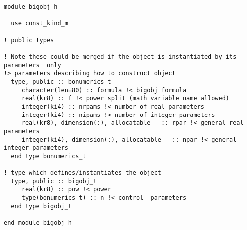 \small
\begin{verbatim}
module bigobj_h

  use const_kind_m

! public types

! Note these could be merged if the object is instantiated by its parameters  only
!> parameters describing how to construct object
  type, public :: bonumerics_t
     character(len=80) :: formula !< bigobj formula
     real(kr8) :: f !< power split (math variable name allowed)
     integer(ki4) :: nrpams !< number of real parameters
     integer(ki4) :: nipams !< number of integer parameters
     real(kr8), dimension(:), allocatable   :: rpar !< general real parameters
     integer(ki4), dimension(:), allocatable   :: npar !< general integer parameters
  end type bonumerics_t

! type which defines/instantiates the object
  type, public :: bigobj_t
     real(kr8) :: pow !< power
     type(bonumerics_t) :: n !< control  parameters
  end type bigobj_t

end module bigobj_h
\end{verbatim}
\normalsize
